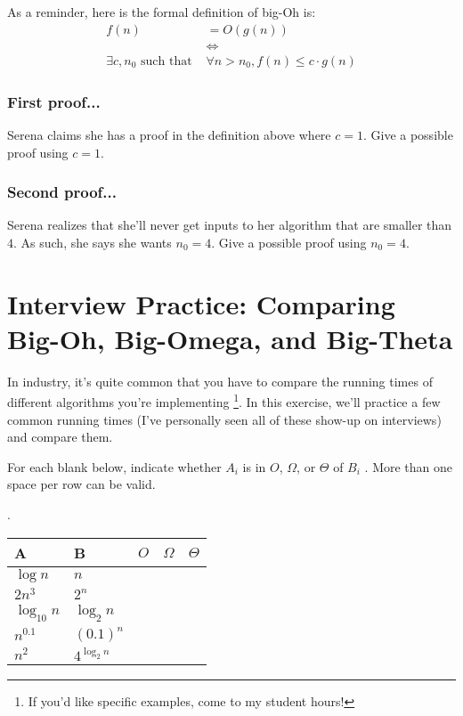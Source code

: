 \documentclass [12pt]{article}
\begin{document}
As a reminder, here is the formal definition of big-Oh is:
\begin{align*}
f(n) &= O(g(n)) \\
&\iff \\
\exists c, n_0 \text{ such that } &\forall n > n_0, f(n) \leq c \cdot g(n)
\end{align*}


\subsubsection{First proof...}
 Serena claims she has a proof in the definition above where $c = 1$. Give a possible proof using $c=1$.

\subsubsection{Second proof...}
 Serena realizes that she'll never get inputs to her algorithm that are smaller than $4$. As such, she says she wants $n_0 = 4$. Give a possible proof using $n_0 = 4$.



\pagebreak
\section{Interview Practice: Comparing Big-Oh, Big-Omega, and Big-Theta}
 In industry, it's quite common that you have to compare the running times of different algorithms you're implementing {\footnote{If you'd like specific examples, come to my student hours!}}. In this exercise, we'll practice a few common running times (I've personally seen all of these show-up on interviews) and compare them.

For each blank below, indicate whether $A_i$ is in $O$, $\Omega$, or $\Theta$ of $B_i$
. More than one space per row can be valid.

.

\begin{table}[h!]
\centering
\begin{tabular}{|l|l|l|l|l|}
\hline
\textbf{A} & \textbf{B} & $O$ & $\Omega$ & $\Theta$ \\ \hline
    $\log n$       &      $n$      &  &  &  \\ \hline
     $2n^3$      &  $2^n$         &  &  &  \\ \hline
       $\log_10 n$    &  $\log_2 n$          &  &  &  \\ \hline
    $n^{0.1}$    &  $(0.1)^n$          &  &  &  \\ \hline
    $n^2$    &  $4^{\log_2 n}$          &  &  &  \\ \hline
\end{tabular}
\end{table}
\end{document}

